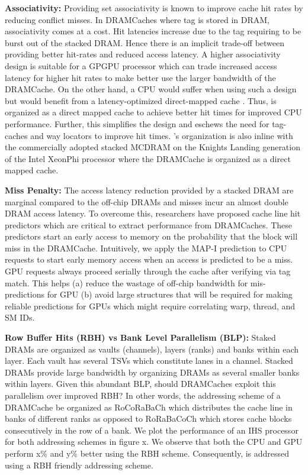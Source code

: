 \par \textbf{Associativity:} Providing set associativity is known to improve cache hit rates by reducing conflict misses. In DRAMCaches where tag is stored in DRAM,  associativity comes at a cost. Hit latencies increase due to the tag requiring to be burst out of the stacked DRAM. Hence there is an implicit trade-off between providing better hit-rates and reduced access latency. A higher associativity design is suitable for a GPGPU processor which can trade increased access latency for higher hit rates to make better use the larger bandwidth of the DRAMCache. On the other hand, a CPU would suffer when using such a design but would benefit from a latency-optimized direct-mapped cache \cite{alloy}. Thus, \cachename is organized as a direct mapped cache to achieve better hit times for improved CPU performance. Further, this simplifies the design and eschews the need for tag-caches \cite{atcache} and way locators \cite{bimodal} to improve hit times. \cachename's organization is also inline with the commercially adopted stacked MCDRAM on the Knights Landing generation of the Intel XeonPhi processor \cite{xeonphi} where the DRAMCache is organized as a direct mapped cache.

\par \textbf{Miss Penalty:} The access latency reduction provided by a stacked DRAM are marginal compared to the off-chip DRAMs and misses incur an almost double DRAM access latency. To overcome this, researchers have proposed cache line hit predictors \cite{loh-hill,alloy} which are critical to extract performance from DRAMCaches. These predictors start an early access to memory on the probability that the block will miss in the DRAMCache. Intuitively, we apply the MAP-I prediction \cite{alloy} to CPU requests to start early memory access when an access is predicted to be a miss. GPU requests always proceed serially through the cache after verifying via tag match. This helps (a) reduce the wastage of off-chip bandwidth for mis-predictions for GPU (b) avoid large structures that will be required for making reliable predictions for GPUs which might require correlating warp, thread, and SM IDs.

\par \textbf{Row Buffer Hits (RBH) vs Bank Level Parallelism (BLP):} Staked DRAMs are organized as vaults (channels), layers (ranks) and banks within each layer. Each vault has several TSVs which constitute lanes in a channel. Stacked DRAMs provide large bandwidth by organizing DRAMs as several smaller banks within layers. Given this abundant BLP, should DRAMCaches exploit this parallelism over improved RBH? In other words, the addressing scheme of a DRAMCache be organized as RoCoRaBaCh which distributes the cache line in banks of different ranks as opposed to RoRaBaCoCh which stores cache blocks consecutively in the row of a bank. We plot the performance of an IHS processor for both addressing schemes in figure x. We observe that both the CPU and GPU perform x\% and y\% better using the RBH scheme. Consequently, \cachename is addressed using a RBH friendly addressing scheme.